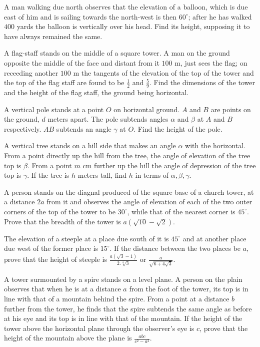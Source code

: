 \item A man walking due north observes that the elevation of a balloon, which is due east of him and is sailing towards the
  north-west is then $60^\circ$; after he has walked $400$ yards the balloon is vertically over his head. Find its
  height, supposing it to have always remained the same.

\item A flag-staff stands on the middle of a square tower. A man on the ground opposite the middle of the face and distant from it
  $100$ m, just sees the flag; on receeding another $100$ m the tangents of the elevation of the top of the tower
  and the top of the flag staff are found to be $\frac{1}{2}$ and $\frac{5}{9}$. Find the dimensions of the tower
  and the height of the flag staff, the ground being horizontal.

\item A vertical pole stands at a point $O$ on horizontal ground. $A$ and $B$ are points on the ground, $d$
  meters apart. The pole subtends angles $\alpha$ and $\beta$ at $A$ and $B$ respectively. $AB$
  subtends an angle $\gamma$ at $O$. Find the height of the pole.

\item A vertical tree stands on a hill side that makes an angle $\alpha$ with the horizontal. From a point directly up the
  hill from the tree, the angle of elevation of the tree top is $\beta$. From a point $m$ cm further up the hill the
  angle of depression of the tree top is $\gamma$. If the tree is $h$ meters tall, find $h$ in terms of
  $\alpha, \beta, \gamma$.

\item A person stands on the diagnal produced of the square base of a church tower, at a distance $2a$ from it and observes
  the angle of elevation of each of the two outer corners of the top of the tower to be $30^\circ$, while that of the
  nearest corner is $45^\circ$. Prove that the breadth of the tower is $a(\sqrt{10} - \sqrt{2})$.

\item The elevation of a steeple at a place due south of it is $45^\circ$ and at another place due west of the former place is
  $15^\circ$. If the distance between the two places be $a$, prove that the height of steeple is
  $\frac{a(\sqrt{3} - 1)}{2.\sqrt[4]{3}}$ or $\frac{a}{\sqrt{6 + 4\sqrt{3}}}$.

\item A tower surmounted by a spire stands on a level plane. A person on the plain observes that when he is at a distance $a$
  from the foot of the tower, its top is in line with that of a mountain behind the spire. From a point at a distance $b$
  further from the tower, he finds that the spire subtends the same angle as before at his eye and its top is in line with that
  of the mountain. If the height of the tower above the horizontal plane through the observer's eye is $c$, prove that the
  height of the mountain above the plane is $\frac{abc}{c^2 - a^2}$.

